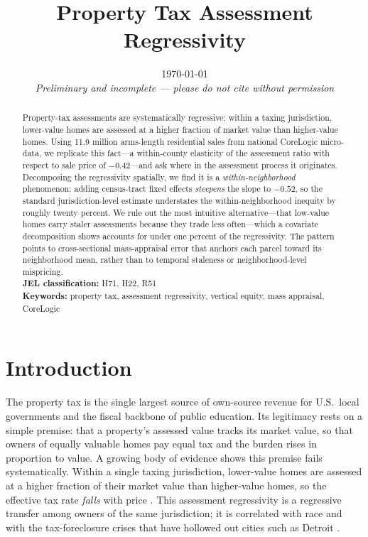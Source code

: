 \documentclass[12pt, letterpaper]{article}
\title{Property Tax Assessment Regressivity}
\date{\today\\\textit{Preliminary and incomplete --- please do not cite without permission}}
\begin{document}
\maketitle

\begin{abstract}
\noindent Property-tax assessments are systematically regressive: within a taxing jurisdiction, lower-value homes are assessed at a higher fraction of market value than higher-value homes. Using 11.9 million arms-length residential sales from national CoreLogic micro-data, we replicate this fact---a within-county elasticity of the assessment ratio with respect to sale price of $-0.42$---and ask where in the assessment process it originates. Decomposing the regressivity spatially, we find it is a \emph{within-neighborhood} phenomenon: adding census-tract fixed effects \emph{steepens} the slope to $-0.52$, so the standard jurisdiction-level estimate understates the within-neighborhood inequity by roughly twenty percent. We rule out the most intuitive alternative---that low-value homes carry staler assessments because they trade less often---which a covariate decomposition shows accounts for under one percent of the regressivity. The pattern points to cross-sectional mass-appraisal error that anchors each parcel toward its neighborhood mean, rather than to temporal staleness or neighborhood-level mispricing. \\[4pt]
\textbf{JEL classification:} H71, H22, R51 \\
\textbf{Keywords:} property tax, assessment regressivity, vertical equity, mass appraisal, CoreLogic
\end{abstract}

\section{Introduction}\label{sec:intro}

The property tax is the single largest source of own-source revenue for U.S.\ local governments and the fiscal backbone of public education. Its legitimacy rests on a simple premise: that a property's assessed value tracks its market value, so that owners of equally valuable homes pay equal tax and the burden rises in proportion to value. A growing body of evidence shows this premise fails systematically. Within a single taxing jurisdiction, lower-value homes are assessed at a higher fraction of their market value than higher-value homes, so the effective tax rate \emph{falls} with price \citep{berry2021reassessing, mcmillen2020assessment}. This assessment regressivity is a regressive transfer among owners of the same jurisdiction; it is correlated with race \citep{avenancioleon2022assessment} and with the tax-foreclosure crises that have hollowed out cities such as Detroit \citep{atuahene2019taxed, hodge2017assessment}.
\end{document}
